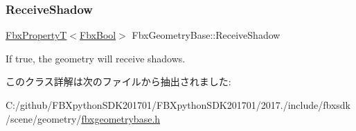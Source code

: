 \mbox{\label{class_fbx_geometry_base_a38e79ed34812e8b02828ebb5690f4ce8}} 
\subsubsection{\texorpdfstring{Receive\+Shadow}{ReceiveShadow}}
{\footnotesize\ttfamily \hyperlink{class_fbx_property_t}{Fbx\+PropertyT}$<$\hyperlink{fbxtypes_8h_a92e0562b2fe33e76a242f498b362262e}{Fbx\+Bool}$>$ Fbx\+Geometry\+Base\+::\+Receive\+Shadow}



If true, the geometry will receive shadows. 



このクラス詳解は次のファイルから抽出されました\+:\begin{DoxyCompactItemize}
\item 
C\+:/github/\+F\+B\+Xpython\+S\+D\+K201701/\+F\+B\+Xpython\+S\+D\+K201701/2017./include/fbxsdk/scene/geometry/\hyperlink{fbxgeometrybase_8h}{fbxgeometrybase.\+h}\end{DoxyCompactItemize}
